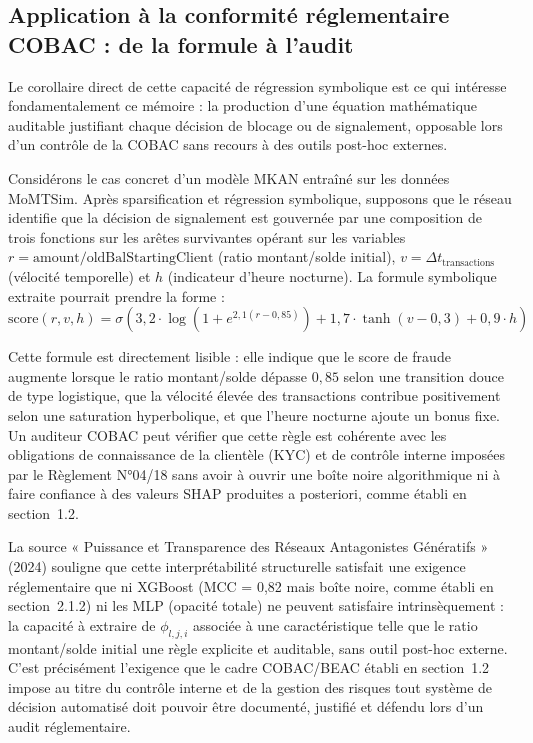 \documentclass[11pt,a4paper,oneside]{report}
\theoremstyle{definition}
\theoremstyle{remark}
\begin{document}
\subsection{Application à la conformité réglementaire COBAC : de la formule à l'audit}

Le corollaire direct de cette capacité de régression symbolique est ce qui intéresse fondamentalement ce mémoire : la production d'une équation mathématique auditable justifiant chaque décision de blocage ou de signalement, opposable lors d'un contrôle de la COBAC sans recours à des outils post-hoc externes.

Considérons le cas concret d'un modèle MKAN entraîné sur les données MoMTSim. Après sparsification et régression symbolique, supposons que le réseau identifie que la décision de signalement est gouvernée par une composition de trois fonctions sur les arêtes survivantes opérant sur les variables $r = \text{amount}/\text{oldBalStartingClient}$ (ratio montant/solde initial), $v = \Delta t_{\text{transactions}}$ (vélocité temporelle) et $h$ (indicateur d'heure nocturne). La formule symbolique extraite pourrait prendre la forme :
\begin{equation}
\text{score}(r, v, h) = \sigma\left(3{,}2 \cdot \log(1 + e^{2{,}1(r - 0{,}85)}) + 1{,}7 \cdot \tanh(v - 0{,}3) + 0{,}9 \cdot h\right)
\end{equation}

Cette formule est directement lisible : elle indique que le score de fraude augmente lorsque le ratio montant/solde dépasse $0{,}85$ selon une transition douce de type logistique, que la vélocité élevée des transactions contribue positivement selon une saturation hyperbolique, et que l'heure nocturne ajoute un bonus fixe. Un auditeur COBAC peut vérifier que cette règle est cohérente avec les obligations de connaissance de la clientèle (KYC) et de contrôle interne imposées par le Règlement N°04/18  sans avoir à ouvrir une boîte noire algorithmique ni à faire confiance à des valeurs SHAP produites a posteriori, comme établi en section~1.2.

La source « Puissance et Transparence des Réseaux Antagonistes Génératifs » (2024) souligne que cette interprétabilité structurelle satisfait une exigence réglementaire que ni XGBoost (MCC = 0,82 mais boîte noire, comme établi en section~2.1.2) ni les MLP (opacité totale) ne peuvent satisfaire intrinsèquement : la capacité à extraire de $\phi_{l,j,i}$ associée à une caractéristique telle que le ratio montant/solde initial une règle explicite et auditable, sans outil post-hoc externe. C'est précisément l'exigence que le cadre COBAC/BEAC établi en section~1.2 impose au titre du contrôle interne et de la gestion des risques  tout système de décision automatisé doit pouvoir être documenté, justifié et défendu lors d'un audit réglementaire.
\end{document}
